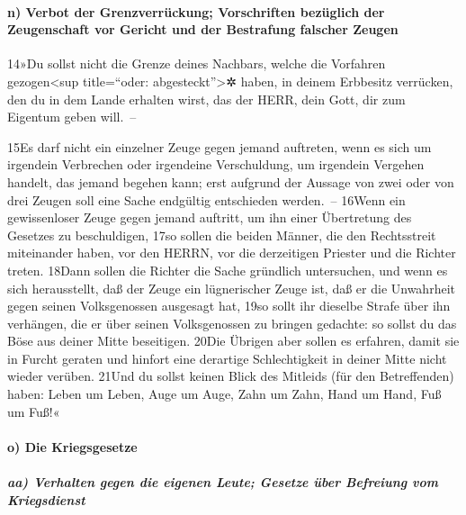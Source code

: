 \hypertarget{n-verbot-der-grenzverruxfcckung-vorschriften-bezuxfcglich-der-zeugenschaft-vor-gericht-und-der-bestrafung-falscher-zeugen}{%
\paragraph{n) Verbot der Grenzverrückung; Vorschriften bezüglich der
Zeugenschaft vor Gericht und der Bestrafung falscher
Zeugen}\label{n-verbot-der-grenzverruxfcckung-vorschriften-bezuxfcglich-der-zeugenschaft-vor-gericht-und-der-bestrafung-falscher-zeugen}}

14»Du sollst nicht die Grenze deines Nachbars, welche die Vorfahren
gezogen\textless sup title=``oder: abgesteckt''\textgreater✲ haben, in
deinem Erbbesitz verrücken, den du in dem Lande erhalten wirst, das der
HERR, dein Gott, dir zum Eigentum geben will.~--

15Es darf nicht ein einzelner Zeuge gegen jemand auftreten, wenn es sich
um irgendein Verbrechen oder irgendeine Verschuldung, um irgendein
Vergehen handelt, das jemand begehen kann; erst aufgrund der Aussage von
zwei oder von drei Zeugen soll eine Sache endgültig entschieden
werden.~-- 16Wenn ein gewissenloser Zeuge gegen jemand auftritt, um ihn
einer Übertretung des Gesetzes zu beschuldigen, 17so sollen die beiden
Männer, die den Rechtsstreit miteinander haben, vor den HERRN, vor die
derzeitigen Priester und die Richter treten. 18Dann sollen die Richter
die Sache gründlich untersuchen, und wenn es sich herausstellt, daß der
Zeuge ein lügnerischer Zeuge ist, daß er die Unwahrheit gegen seinen
Volksgenossen ausgesagt hat, 19so sollt ihr dieselbe Strafe über ihn
verhängen, die er über seinen Volksgenossen zu bringen gedachte: so
sollst du das Böse aus deiner Mitte beseitigen. 20Die Übrigen aber
sollen es erfahren, damit sie in Furcht geraten und hinfort eine
derartige Schlechtigkeit in deiner Mitte nicht wieder verüben. 21Und du
sollst keinen Blick des Mitleids (für den Betreffenden) haben: Leben um
Leben, Auge um Auge, Zahn um Zahn, Hand um Hand, Fuß um Fuß!«

\hypertarget{o-die-kriegsgesetze}{%
\paragraph{o) Die Kriegsgesetze}\label{o-die-kriegsgesetze}}

\hypertarget{aa-verhalten-gegen-die-eigenen-leute-gesetze-uxfcber-befreiung-vom-kriegsdienst}{%
\subparagraph{aa) Verhalten gegen die eigenen Leute; Gesetze über
Befreiung vom
Kriegsdienst}\label{aa-verhalten-gegen-die-eigenen-leute-gesetze-uxfcber-befreiung-vom-kriegsdienst}}

